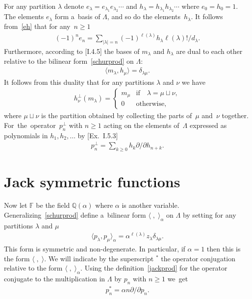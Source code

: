 For any partition $\lambda$ denote $ e_\lambda=e_{\lambda_1}e_{\lambda_2}\cdots $ and $
h_\lambda=h_{\lambda_1}h_{\lambda_2}\cdots $ where $e_0=h_0=1$.
The elements $e_\lambda$ form a~basis of $\Lambda$, and so do the elements~$h_\lambda$.
It follows from~\eqref{eh} that for any~$n\ge1$
\begin{gather}
\label{ehnu}
(-1)^ne_n=\sum_{|\lambda|=n}(-1)^{\ell(\lambda)}h_\lambda\ell(\lambda)
!/d_\lambda.
\end{gather}
Furthermore, according to [I.4.5] the bases of $m_\lambda$ and $h_\lambda$ are dual to each other relative
to the bilinear form~\eqref{schurprod} on $\Lambda$:
\begin{gather}
\label{mh}
\langle m_\lambda,h_\mu\rangle=\delta_{\lambda\mu}.
\end{gather}
It follows from this duality that for any partitions $\lambda$ and $\nu$ we have
\begin{gather}
\label{hperp}
h_\nu^\perp(m_\lambda)=
\begin{cases}
m_\mu&\text{if}\quad\lambda=\mu\sqcup\nu,
\\
0&\text{otherwise,}
\end{cases}
\end{gather}
where $\mu\sqcup\nu$ is the partition obtained by collecting the parts of~$\mu$ and~$\nu$ together.
For~the~opera\-tor~$p_n^{\perp}$ with $n\ge1$ acting on the elements of~$\Lambda$ expressed as
polynomials in $h_1, h_2, \ldots$ by [Ex.~I.5.3]
\begin{gather}
\label{pperp}
p_n^{\perp}=\sum_{k\ge0}h_k\partial /\partial h_{n+k}.
\end{gather}

\section{Jack symmetric functions}\label{Section5}

Now let $\mathbb F$ be the f\/ield $\mathbb Q(\alpha)$ where $\alpha$ is another variable.
Generalizing~\eqref{schurprod} def\/ine a~bilinear form $\langle\;,\;\rangle_\alpha$ on $\Lambda$
by setting for any partitions $\lambda$ and $\mu$
\begin{gather}
\label{jackprod}
\langle p_\lambda,p_\mu\rangle_\alpha=\alpha^{\ell(\lambda)}
z_\lambda\delta_{\lambda\mu}.
\end{gather}
This form is symmetric and non-degenerate.
In particular, if $\alpha=1$ then this is the form $\langle\;,\; \rangle$.
We will indicate by the superscript ${}^\ast$ the operator conjugation relative to the form
$\langle\;,\;\rangle_\alpha$.
Using the def\/inition~\eqref{jackprod} for the operator conjugate to the multiplication in $\Lambda$ by
$p_n$ with $n\ge1$ we~get
\begin{gather}
\label{pnast}
p_n^{\ast}=\alpha n\partial /\partial p_n.
\end{gather}

